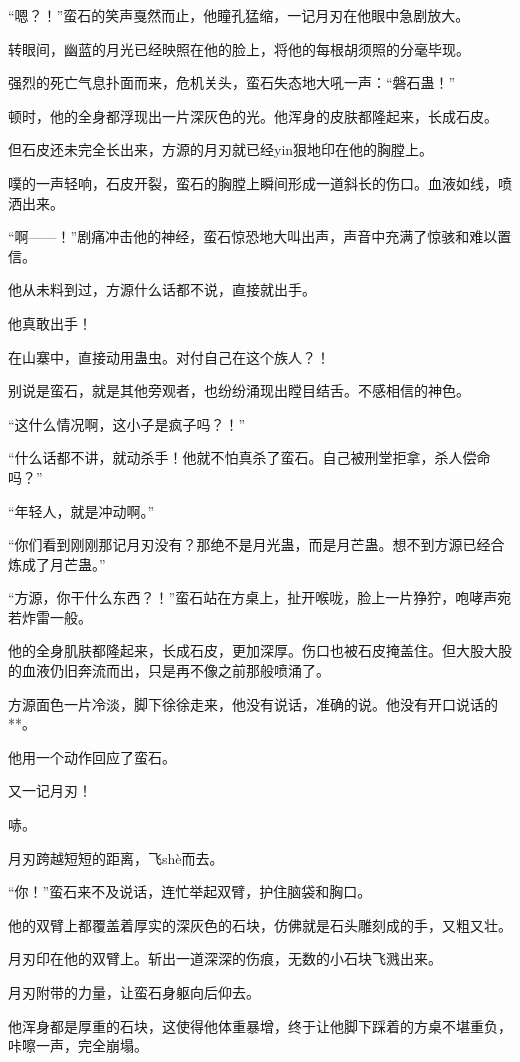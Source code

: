 \begin{this_body}
“嗯？！”蛮石的笑声戛然而止，他瞳孔猛缩，一记月刃在他眼中急剧放大。

转眼间，幽蓝的月光已经映照在他的脸上，将他的每根胡须照的分毫毕现。

强烈的死亡气息扑面而来，危机关头，蛮石失态地大吼一声：“磐石蛊！”

顿时，他的全身都浮现出一片深灰色的光。他浑身的皮肤都隆起来，长成石皮。

但石皮还未完全长出来，方源的月刃就已经yin狠地印在他的胸膛上。

噗的一声轻响，石皮开裂，蛮石的胸膛上瞬间形成一道斜长的伤口。血液如线，喷洒出来。

“啊——！”剧痛冲击他的神经，蛮石惊恐地大叫出声，声音中充满了惊骇和难以置信。

他从未料到过，方源什么话都不说，直接就出手。

他真敢出手！

在山寨中，直接动用蛊虫。对付自己在这个族人？！

别说是蛮石，就是其他旁观者，也纷纷涌现出瞠目结舌。不感相信的神色。

“这什么情况啊，这小子是疯子吗？！”

“什么话都不讲，就动杀手！他就不怕真杀了蛮石。自己被刑堂拒拿，杀人偿命吗？”

“年轻人，就是冲动啊。”

“你们看到刚刚那记月刃没有？那绝不是月光蛊，而是月芒蛊。想不到方源已经合炼成了月芒蛊。”

“方源，你干什么东西？！”蛮石站在方桌上，扯开喉咙，脸上一片狰狞，咆哮声宛若炸雷一般。

他的全身肌肤都隆起来，长成石皮，更加深厚。伤口也被石皮掩盖住。但大股大股的血液仍旧奔流而出，只是再不像之前那般喷涌了。

方源面色一片冷淡，脚下徐徐走来，他没有说话，准确的说。他没有开口说话的**。

他用一个动作回应了蛮石。

又一记月刃！

哧。

月刃跨越短短的距离，飞shè而去。

“你！”蛮石来不及说话，连忙举起双臂，护住脑袋和胸口。

他的双臂上都覆盖着厚实的深灰色的石块，仿佛就是石头雕刻成的手，又粗又壮。

月刃印在他的双臂上。斩出一道深深的伤痕，无数的小石块飞溅出来。

月刃附带的力量，让蛮石身躯向后仰去。

他浑身都是厚重的石块，这使得他体重暴增，终于让他脚下踩着的方桌不堪重负，咔嚓一声，完全崩塌。


\end{this_body}

